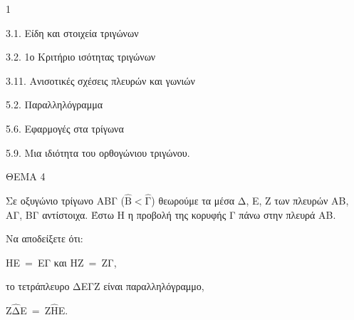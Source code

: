\begin{ylh}{1}
    \item 3.1. Είδη και στοιχεία τριγώνων
    \item 3.2. 1ο Κριτήριο ισότητας τριγώνων
    \item 3.11. Ανισοτικές σχέσεις πλευρών και γωνιών
    \item 5.2. Παραλληλόγραμμα
    \item 5.6. Εφαρμογές στα τρίγωνα
    \item 5.9. Μια ιδιότητα του ορθογώνιου τριγώνου.
\end{ylh}

ΘΕΜΑ 4

Σε οξυγώνιο τρίγωνο ΑΒΓ ($\widehat{\text{Β}} < \widehat{\text{Γ}}$) θεωρούμε τα μέσα Δ, Ε, Ζ των πλευρών ΑΒ, ΑΓ, ΒΓ αντίστοιχα. Έστω Η η προβολή της κορυφής Γ πάνω στην πλευρά ΑΒ.

Να αποδείξετε ότι:

\begin{alist}
\item ΗΕ$\  = \ $ΕΓ και ΗΖ$\  = \ $ΖΓ, 

\item το τετράπλευρο ΔΕΓΖ είναι παραλληλόγραμμο, 

\item Ζ$\widehat{\text{Δ}}$Ε$\  = \ $Ζ$\widehat{\text{Η}}$Ε. 
\end{alist}
